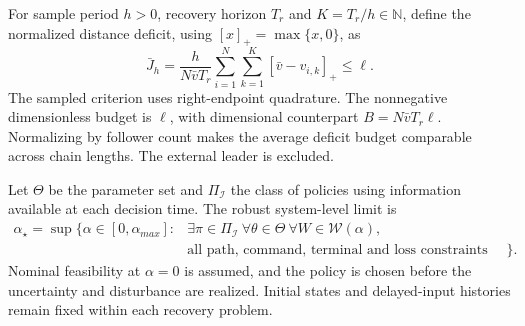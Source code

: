 \documentclass[11pt]{article}
\newcommand{\astar}{\alpha_\star}
\newcommand{\PI}{\Pi_{\mathcal I}}
\begin{document}
For sample period $h>0$, recovery horizon $T_r$ and $K=T_r/h\in\mathbb N$, define the normalized distance deficit, using $[x]_+=\max\{x,0\}$, as
\begin{equation}
\bar J_h=\frac{h}{N\bar vT_r}\sum_{i=1}^{N}\sum_{k=1}^{K}[\bar v-v_{i,k}]_+\leq\ell.
\label{eq:loss}
\end{equation}
The sampled criterion uses right-endpoint quadrature. The nonnegative dimensionless budget is $\ell$, with dimensional counterpart $B=N\bar vT_r\ell$. Normalizing by follower count makes the average deficit budget comparable across chain lengths. The external leader is excluded.

Let $\Theta$ be the parameter set and $\PI$ the class of policies using information available at each decision time. The robust system-level limit is
\begin{equation}
\begin{aligned}
\astar=\sup\big\{\alpha\in[0,\alpha_{max}]:{}&\exists\pi\in\PI\ \forall\theta\in\Theta\ \forall W\in\mathcal W(\alpha),\\
&\text{all path, command, terminal and loss constraints hold}\big\}.
\end{aligned}
\label{eq:astar}
\end{equation}
Nominal feasibility at $\alpha=0$ is assumed, and the policy is chosen before the uncertainty and disturbance are realized. Initial states and delayed-input histories remain fixed within each recovery problem.
\end{document}
